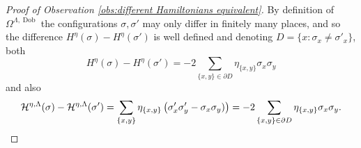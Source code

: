 \documentclass[11pt, reqno]{amsart}
\DeclareMathOperator{\Dob}{Dob}
\numberwithin{equation}{section}
\begin{document}
\begin{proof}[Proof of Observation \ref{obs:different Hamiltonians equivalent}]
By definition of $\Omega^{\Lambda,\Dob}$ the configurations $\sigma,\sigma'$ may only differ in finitely many places, and so the difference $H^{\eta}(\sigma)-H^{\eta}(\sigma')$ is well defined and denoting $D=\{x: \sigma_x \neq \sigma'_x \}$, both
\begin{equation*}
H^{\eta}(\sigma)- 
H^{\eta}(\sigma')=-2\sum_{\{ x,y\}\in \partial D } \eta_{\{x,y\} } \sigma_x \sigma_y  
\end{equation*}
and also
\begin{equation*}
\mathcal{H}^{\eta,\Lambda}(\sigma)- 
\mathcal{H}^{\eta, \Lambda}(\sigma')=\sum_{\{ x,y\}}  \eta_{\{x,y\} } \left(\sigma'_{x}\sigma'_y-\sigma_{x}\sigma_{y}) \right)=-2\sum_{\{ x,y\}\in \partial D}  \eta_{\{x,y\} } \sigma_{x}\sigma_{y}.
\qedhere
\end{equation*}
\end{proof}
\end{document}
